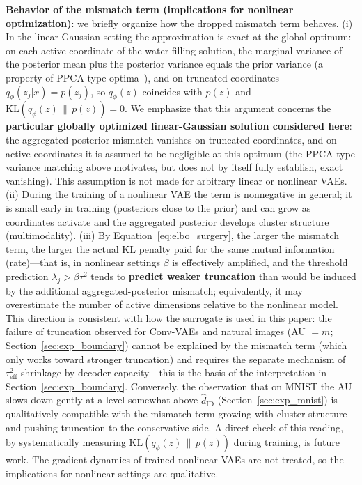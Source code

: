 \documentclass[make,article,submit,pdftex,moreauthors]{Definitions/mdpi}
\newcommand{\hatdID}{\hat{d}_{\mathrm{ID}}}
\begin{document}
\textbf{Behavior of the mismatch term (implications for nonlinear
optimization)}:
we briefly organize how the dropped mismatch term behaves.
(i) In the linear-Gaussian setting the approximation is exact at the global
optimum: on each active coordinate of the water-filling solution, the
marginal variance of the posterior mean plus the posterior variance equals
the prior variance (a property of PPCA-type
optima~\cite{tippingbishop1999ppca,lucas2019elbo}), and on truncated
coordinates $q_\phi(z_j|x) = p(z_j)$, so $q_\phi(z)$ coincides with $p(z)$
and $\mathrm{KL}(q_\phi(z)\,\|\,p(z)) = 0$.
We emphasize that this argument concerns the \textbf{particular globally
optimized linear-Gaussian solution considered here}: the
aggregated-posterior mismatch vanishes on truncated coordinates, and on
active coordinates it is assumed to be negligible at this optimum (the
PPCA-type variance matching above motivates, but does not by itself fully
establish, exact vanishing).
This assumption is not made for arbitrary linear or nonlinear VAEs.
(ii) During the training of a nonlinear VAE the term is nonnegative in
general; it is small early in training (posteriors close to the prior) and
can grow as coordinates activate and the aggregated posterior develops
cluster structure (multimodality).
(iii) By Equation~\eqref{eq:elbo_surgery}, the larger the mismatch term,
the larger the actual KL penalty paid for the same mutual information
(rate)---that is, in nonlinear settings $\beta$ is effectively amplified,
and the threshold prediction $\lambda_j > \beta\tau^2$ tends to
\textbf{predict weaker truncation} than would be induced by the additional
aggregated-posterior mismatch; equivalently, it may overestimate the number
of active dimensions relative to the nonlinear model.
This direction is consistent with how the surrogate is used in this paper:
the failure of truncation observed for Conv-VAEs and natural images
(AU $= m$; Section~\ref{sec:exp_boundary}) cannot be explained by the
mismatch term (which only works toward stronger truncation) and requires
the separate mechanism of $\tau^2_{\mathrm{eff}}$ shrinkage by decoder
capacity---this is the basis of the interpretation in
Section~\ref{sec:exp_boundary}.
Conversely, the observation that on MNIST the AU slows down gently at a
level somewhat above $\hatdID$ (Section~\ref{sec:exp_mnist}) is
qualitatively compatible with the mismatch term growing with cluster
structure and pushing truncation to the conservative side.
A direct check of this reading, by systematically measuring
$\mathrm{KL}(q_\phi(z)\,\|\,p(z))$ during training, is future work.
The gradient dynamics of trained nonlinear VAEs are not treated, so the
implications for nonlinear settings are qualitative.
\end{document}
